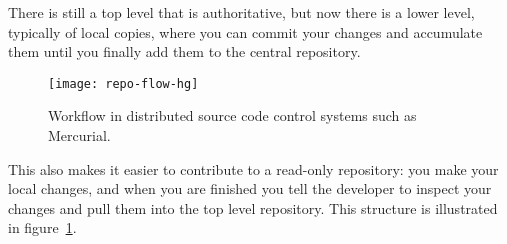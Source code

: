 There is still a top level that is authoritative, but
now there is a lower level, typically of local copies, where you can
commit your changes and accumulate them until you finally add them to
the central repository.
\begin{figure}[ht]
\texttt{[image: repo-flow-hg]}
\caption{Workflow in distributed source code control systems such as Mercurial.}
\label{fig:hg}
\end{figure}
This also makes it easier to contribute to a read-only repository:
you make your local changes, and when you are finished you tell the 
developer to inspect your changes and pull them into the top level 
repository. This structure is illustrated in figure~\ref{fig:hg}.

%


